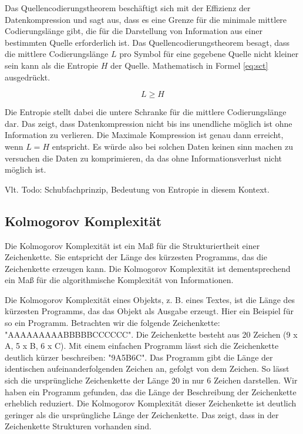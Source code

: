 \documentclass[conference]{IEEEtran}
\begin{document}
Das Quellencodierungstheorem beschäftigt sich mit der Effizienz der Datenkompression
und sagt aus, dass es eine Grenze für die minimale mittlere Codierungslänge gibt,
die für die Darstellung von Information aus einer bestimmten Quelle erforderlich
ist. \cite{sharma}
Das Quellencodierungstheorem besagt, dass die mittlere Codierungslänge $L$ pro Symbol
für eine gegebene Quelle nicht kleiner sein kann als die Entropie $H$ der Quelle.
Mathematisch in Formel \ref{eq:sct} ausgedrückt.

\begin{equation}
  \label{eq:sct}
  L \ge H
\end{equation}

Die Entropie stellt dabei die untere Schranke für die mittlere Codierungslänge dar.
Das zeigt, dass Datenkompression nicht bis ins unendliche möglich ist ohne
Information zu verlieren.
Die Maximale Kompression ist genau dann erreicht, wenn $L = H$ entspricht.
Es würde also bei solchen Daten keinen sinn machen zu versuchen die Daten
zu komprimieren, da das ohne Informationsverlust nicht möglich ist.

Vlt. Todo: Schubfachprinzip, Bedeutung von Entropie in diesem Kontext.

\subsection{Kolmogorov Komplexität}

Die Kolmogorov Komplexität ist ein Maß für die Strukturiertheit einer Zeichenkette.
Sie entspricht der Länge des kürzesten Programms, das die Zeichenkette erzeugen
kann. \cite{li}
Die Kolmogorov Komplexität ist dementsprechend ein Maß für die algorithmische Komplexität
von Informationen.

Die Kolmogorov Komplexität eines Objekts, z. B. eines Textes, ist die Länge
des kürzesten Programms, das das Objekt als Ausgabe erzeugt.
Hier ein Beispiel für so ein Programm.
Betrachten wir die folgende Zeichenkette: "AAAAAAAAABBBBBCCCCCC".
Die Zeichenkette besteht aus 20 Zeichen (9 x A, 5 x B, 6 x C).
Mit einem einfachen Programm lässt sich die Zeichenkette deutlich kürzer
beschreiben: "9A5B6C".
Das Programm gibt die Länge der identischen aufeinanderfolgenden Zeichen an,
gefolgt von dem Zeichen.
So lässt sich die ursprüngliche Zeichenkette der Länge 20 in nur 6 Zeichen darstellen.
Wir haben ein Programm gefunden, das die Länge der Beschreibung der Zeichenkette
erheblich reduziert.
Die Kolmogorov Komplexität dieser Zeichenkette ist deutlich geringer als
die ursprüngliche Länge der Zeichenkette.
Das zeigt, dass in der Zeichenkette Strukturen vorhanden sind.
\end{document}
